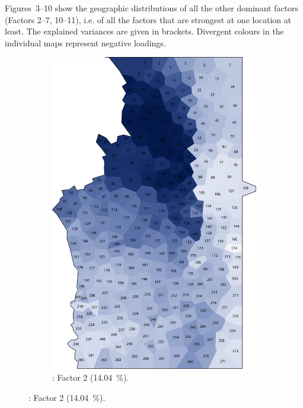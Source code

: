 \documentclass[output=paper]{LSP/langsci}
\begin{document}
Figures~3–10 show the geographic distributions of all the other dominant factors (Factors 2–7, 10–11), i.e. of all the factors that are strongest at one location at least. The explained variances are given in brackets. Divergent colours in the individual maps represent negative loadings. 

\begin{figure}
\centering
\begin{subfigure}[t]{0.3\textwidth}
\includegraphics[width=\textwidth]{illustrations/pickl_fig3}
\caption{: Factor 2 (14.04~\%).}
\label{fig:3}
\end{subfigure}   

\end{figure}
\end{document}
